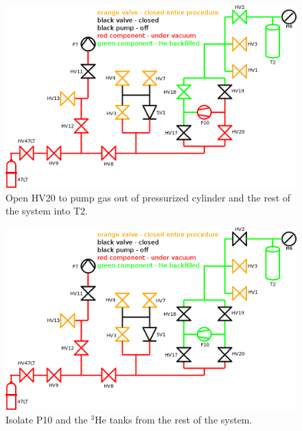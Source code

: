 \documentclass[a4paper,10pt]{article}
\begin{document}
\begin{figure}[htbp!]
 \centering
 \includegraphics[width=\textwidth]{./he-3-transfer-08-open-hv20.png}
 \caption{Open HV20 to pump gas out of pressurized cylinder and the rest of the system into T2.}
 \label{f}
\end{figure}

\begin{figure}[htbp!]
 \centering
 \includegraphics[width=\textwidth]{./he-3-transfer-09-turn-off-p10.png}
 \caption{Isolate P10 and the $^3$He tanks from the rest of the system.}
 \label{g}
\end{figure}
\end{document}
